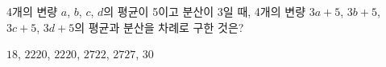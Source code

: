 4개의 변량 $a$, $b$, $c$, $d$의 평균이 5이고 분산이 3일 때, 4개의 변량 $3a+5$, $3b+5$, $3c+5$, $3d+5$의 평균과 분산을 차례로 구한 것은?
\begin{choices32}{$18$, $22$}{$20$, $22$}{$20$, $27$}{$22$, $27$}{$27$, $30$}\end{choices32}
